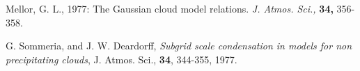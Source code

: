 \por
Mellor, G. L., 1977: The Gaussian cloud model relations.
{\it J. Atmos. Sci.,} {\bf 34,} 356-358.

\por   G. { Sommeria}, and J. W. { Deardorff},
           {\it Subgrid scale condensation in models for non precipitating
                clouds},
           J. Atmos. Sci., {\bf 34}, 344-355, 1977.

